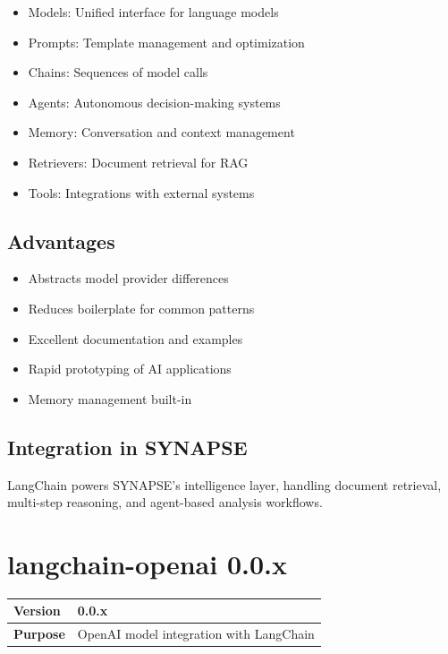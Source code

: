 \documentclass[12pt,a4paper]{report}
\begin{document}
\begin{itemize}
    \item Models: Unified interface for language models
    \item Prompts: Template management and optimization
    \item Chains: Sequences of model calls
    \item Agents: Autonomous decision-making systems
    \item Memory: Conversation and context management
    \item Retrievers: Document retrieval for RAG
    \item Tools: Integrations with external systems
\end{itemize}

\subsection{Advantages}

\begin{itemize}
    \item Abstracts model provider differences
    \item Reduces boilerplate for common patterns
    \item Excellent documentation and examples
    \item Rapid prototyping of AI applications
    \item Memory management built-in
\end{itemize}

\subsection{Integration in SYNAPSE}

LangChain powers SYNAPSE's intelligence layer, handling document retrieval, multi-step reasoning, and agent-based analysis workflows.

\section{langchain-openai 0.0.x}

\begin{tabular}{|p{4cm}|p{10cm}|}
\hline
\textbf{Version} & 0.0.x \\
\hline
\textbf{Purpose} & OpenAI model integration with LangChain \\
\hline
\end{tabular}
\end{document}
